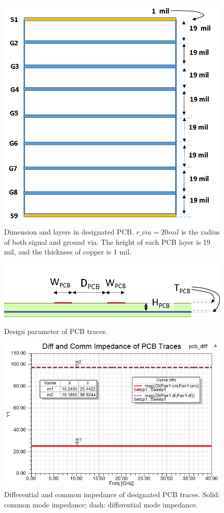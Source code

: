 \documentclass{book}  %
\begin{document}
\begin{paper}
\begin{figure}[htbp!]
	\centering
	\includegraphics[width=0.8\columnwidth]{./img/PCB/PCB_layer_dimension.png}
	\caption{Dimension and layers in designated PCB. $r\_via=20 mil$ is the radius of both signal and ground via. The height of each PCB layer is 19 mil, and the thickness of copper is 1 mil. }
	\label{fig:pcb_layers} %
\end{figure}

\begin{figure}[htbp!]
	\centering
	\includegraphics[width=0.8\columnwidth]{./img/PCB/differential_PCB_2D_CrossSection.png}
	\caption{Design parameter of PCB traces.}
	\label{fig:pcb_trace} %
\end{figure}

\begin{figure}[htbp!]
	\centering
	\includegraphics[width=0.8\columnwidth]{./img/PCB/differential_PCB_2D_impedance.png}
	\caption{Differential and common impedance of designated PCB traces. Solid: common mode impedance; dash: differential mode impedance.}
	\label{fig:pcb_trace_impedance} %
\end{figure}



\end{paper}
\end{document}
